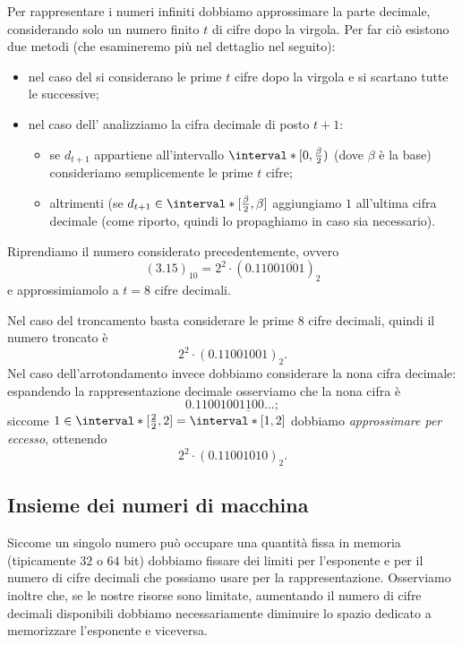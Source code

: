 Per rappresentare i numeri infiniti dobbiamo approssimare la parte decimale, considerando solo un numero finito $t$ di cifre dopo la virgola. Per far ciò esistono due metodi (che esamineremo più nel dettaglio nel seguito):
\begin{itemize}
    \item nel caso del  si considerano le prime $t$ cifre dopo la virgola e si scartano tutte le successive;
    \item nel caso dell' analizziamo la cifra decimale di posto $t+1$: \begin{itemize}
        \item se $d_{t+1}$ appartiene all'intervallo $\interval*[{0, \frac{\beta}{2}})$ (dove $\beta$ è la base) consideriamo semplicemente le prime $t$ cifre;
        \item altrimenti (se $d_{t+1} \in \interval*[{\frac{\beta}{2}, \beta}]$ aggiungiamo $1$ all'ultima cifra decimale (come riporto, quindi lo propaghiamo in caso sia necessario).
    \end{itemize}
\end{itemize}

\begin{example}
    Riprendiamo il numero considerato precedentemente, ovvero \[
        (3.15)_{10} = 2^2 \cdot (0.1100\overline{1001})_2
    \] e approssimiamolo a $t = 8$ cifre decimali.
    
    Nel caso del troncamento basta considerare le prime $8$ cifre decimali, quindi il numero troncato è \[
        2^2 \cdot (0.11001001)_2.
    \] Nel caso dell'arrotondamento invece dobbiamo considerare la nona cifra decimale: espandendo la rappresentazione decimale osserviamo che la nona cifra è \[
        0.11001001\underline100\dots;
    \] siccome $1 \in \interval*[{\frac{2}{2}, 2}] = \interval*[{1, 2}]$ dobbiamo \emph{approssimare per eccesso}, ottenendo \[
        2^2 \cdot (0.11001010)_2.
    \]
\end{example}

\subsection{Insieme dei numeri di macchina}

Siccome un singolo numero può occupare una quantità fissa in memoria (tipicamente $32$ o $64$ bit) dobbiamo fissare dei limiti per l'esponente e per il numero di cifre decimali che possiamo usare per la rappresentazione. 
Osserviamo inoltre che, se le nostre risorse sono limitate, aumentando il numero di cifre decimali disponibili dobbiamo necessariamente diminuire lo spazio dedicato a memorizzare l'esponente e viceversa.

